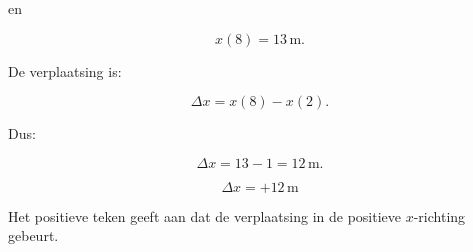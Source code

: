 \documentclass{ximera}
\begin{document}
\begin{oefening}{\oefU\ESS}
\begin{question}
\begin{oplossing}
  en
  
  \[
  x(8)=13\,\mathrm{m}.
  \]
  
  De verplaatsing is:
  
  \[
  \Delta x
  =
  x(8)-x(2).
  \]
  
  Dus:
  
  \[
  \Delta x
  =
  13-1
  =
  12\,\mathrm{m}.
  \]
  
  \[
  \boxed{\Delta x=+12\,\mathrm{m}}
  \]
  
  Het positieve teken geeft aan dat de verplaatsing in de positieve
  $x$-richting gebeurt.
  \end{oplossing}
  \end{question}
  
  \end{oefening}
  
  
  
  
\end{document}
